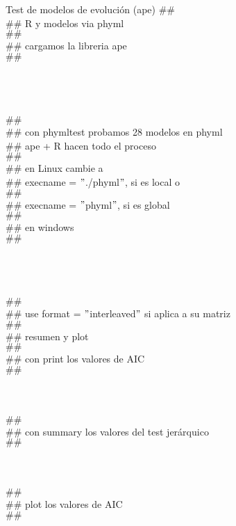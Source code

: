 {Test de modelos de evoluci\'on (ape)}
\label{sec:phytest}
\noindent
$\#\#$
\\$\#\#$ R y modelos via phyml 
\\$\#\#$
\\$\#\#$ cargamos la libreria ape
\\$\#\#$\\
\\
\\
\\
\\$\#\#$
\\$\#\#$  con phymltest probamos 28 modelos en phyml
\\$\#\#$  ape + R hacen todo el proceso
\\$\#\#$
\\$\#\#$  en Linux cambie a
\\$\#\#$  execname = $"$./phyml$"$, si es local o
\\$\#\#$
\\$\#\#$  execname = $"$phyml$"$, si es global
\\$\#\#$
\\$\#\#$ en windows
\\$\#\#$ \\
\\
\\
\\
\\$\#\#$  
\\$\#\#$  use format = $"$interleaved$"$ si aplica a su matriz 
\\$\#\#$
\\$\#\#$ resumen y plot 
\\$\#\#$ 
\\$\#\#$ con print los valores de AIC
\\$\#\#$ \\
\\
\\
\\$\#\#$ 
\\$\#\#$  con summary los valores del test jer\'arquico
\\$\#\#$ \\
\\
\\
\\$\#\#$ 
\\$\#\#$ plot los valores de AIC
\\$\#\#$ \\
\\
\\
